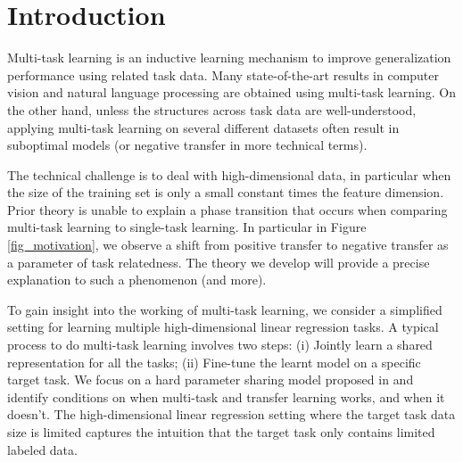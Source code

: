 \section{Introduction}

Multi-task learning is an inductive learning mechanism to improve generalization performance using related task data.
Many state-of-the-art results in computer vision and natural language processing are obtained using multi-task learning.
On the other hand, unless the structures across task data are well-understood, applying multi-task learning on several different datasets often result in suboptimal models (or negative transfer in more technical terms).

 The technical challenge is to deal with high-dimensional data, in particular when the size of the training set is only a small constant times the feature dimension.
Prior theory is unable to explain a phase transition that occurs when comparing multi-task learning to single-task learning.
In particular in Figure \ref{fig_motivation}, we observe a shift from positive transfer to negative transfer as a parameter of task relatedness.
The theory we develop will provide a precise explanation to such a phenomenon (and more).

To gain insight into the working of multi-task learning, we consider a simplified setting for learning multiple high-dimensional linear regression tasks.
A typical process to do multi-task learning involves two steps:
(i) Jointly learn a shared representation for all the tasks;
(ii) Fine-tune the learnt model on a specific target task.
We focus on a hard parameter sharing model proposed in \cite{WZR20} and identify conditions on when multi-task and transfer learning works, and when it doesn't.
The high-dimensional linear regression setting where the target task data size is limited captures the intuition that the target task only contains limited labeled data.


